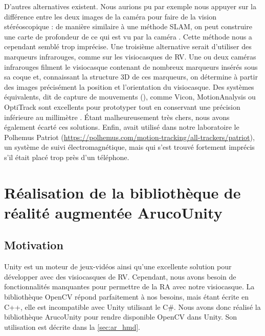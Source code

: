 

D'autres alternatives existent. Nous aurions pu par exemple nous appuyer sur la différence entre les deux images de la caméra pour faire de la vision stéréoscopique : de manière similaire à une méthode SLAM, on peut construire une carte de profondeur de ce qui est vu par la caméra . Cette méthode nous a cependant semblé trop imprécise. Une troisième alternative serait d'utiliser des marqueurs infrarouges, comme sur les visiocasques de RV. Une ou deux caméras infrarouges filment le visiocasque contenant de nombreux marqueurs insérés sous sa coque  et, connaissant la structure 3D de ces marqueurs, on détermine à partir des images précisément la position et l'orientation du visiocasque. Des systèmes équivalents, dit de capture de mouvements (), comme Vicon, MotionAnalysis ou OptiTrack sont excellents pour prototyper tout en conservant une précision inférieure au millimètre . Étant malheureusement très chers, nous avons également écarté ces solutions. Enfin, \cite{Millette2016} avait utilisé dans notre laboratoire le Polhemus Patriot (\url{https://polhemus.com/motion-tracking/all-trackers/patriot}), un système de suivi électromagnétique, mais qui s'est trouvé fortement imprécis s'il était placé trop près d'un téléphone.


\section{Réalisation de la bibliothèque de réalité augmentée ArucoUnity}
\label{sec:aruco_unity}

\subsection{Motivation}
\label{subsec:aruco_unity_motivation}

Unity est un moteur de jeux-vidéos ainsi qu'une excellente solution pour développer avec des visiocasques de RV. Cependant, nous avons besoin de fonctionnalités manquantes pour permettre de la RA avec notre visiocasque. La bibliothèque OpenCV répond parfaitement à nos besoins, mais étant écrite en C++, elle est incompatible avec Unity utilisant le C\#. Nous avons donc réalisé la bibliothèque ArucoUnity pour rendre disponible OpenCV dans Unity. Son utilisation est décrite dans la \autoref{sec:ar_hmd}.

